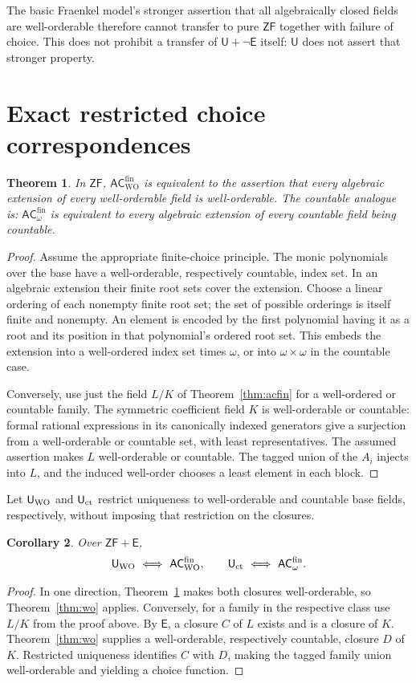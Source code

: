 \documentclass[11pt,a4paper]{article}
\newtheorem{theorem}{Theorem}[section]
\newtheorem{corollary}[theorem]{Corollary}
\theoremstyle{definition}\newtheorem{definition}[theorem]{Definition}
\theoremstyle{remark}\newtheorem{remark}[theorem]{Remark}
\newcommand{\ZF}{\mathsf{ZF}}\newcommand{\ZFA}{\mathsf{ZFA}}
\newcommand{\E}{\mathsf E}\newcommand{\U}{\mathsf U}
\newcommand{\ACwfin}{\mathsf{AC}^{\mathrm{fin}}_{\omega}}
\newcommand{\ACWfin}{\mathsf{AC}^{\mathrm{fin}}_{\mathrm{WO}}}
\begin{document}
The basic Fraenkel model's stronger assertion that all algebraically
closed fields are well-orderable therefore cannot transfer to pure
$\ZF$ together with failure of choice.  This does not prohibit a transfer
of $\U+\neg\E$ itself: $\U$ does not assert that stronger property.


\section{Exact restricted choice correspondences}
\begin{theorem}\label{thm:wocorr}
In $\ZF$, $\ACWfin$ is equivalent to the assertion that every algebraic extension of every well-orderable field is well-orderable. The countable analogue is: $\ACwfin$ is equivalent to every algebraic extension of every countable field being countable.
\end{theorem}
\begin{proof}
Assume the appropriate finite-choice principle. The monic polynomials over the base have a well-orderable, respectively countable, index set. In an algebraic extension their finite root sets cover the extension. Choose a linear ordering of each nonempty finite root set; the set of possible orderings is itself finite and nonempty. An element is encoded by the first polynomial having it as a root and its position in that polynomial's ordered root set. This embeds the extension into a well-ordered index set times $\omega$, or into $\omega\times\omega$ in the countable case.

Conversely, use just the field $L/K$ of Theorem~\ref{thm:acfin} for a well-ordered or countable family. The symmetric coefficient field $K$ is well-orderable or countable: formal rational expressions in its canonically indexed generators give a surjection from a well-orderable or countable set, with least representatives. The assumed assertion makes $L$ well-orderable or countable. The tagged union of the $A_i$ injects into $L$, and the induced well-order chooses a least element in each block.
\end{proof}

Let $\U_{\rm WO}$ and $\U_{\rm ct}$ restrict uniqueness to well-orderable and countable base fields, respectively, without imposing that restriction on the closures.
\begin{corollary}\label{cor:relative}
Over $\ZF+\E$,
\[
\U_{\rm WO}\ \Longleftrightarrow\ \ACWfin,
\qquad
\U_{\rm ct}\ \Longleftrightarrow\ \ACwfin.
\]
\end{corollary}
\begin{proof}
In one direction, Theorem~\ref{thm:wocorr} makes both closures well-orderable, so Theorem~\ref{thm:wo} applies. Conversely, for a family in the respective class use $L/K$ from the proof above. By $\E$, a closure $C$ of $L$ exists and is a closure of $K$. Theorem~\ref{thm:wo} supplies a well-orderable, respectively countable, closure $D$ of $K$. Restricted uniqueness identifies $C$ with $D$, making the tagged family union well-orderable and yielding a choice function.
\end{proof}
\end{document}
